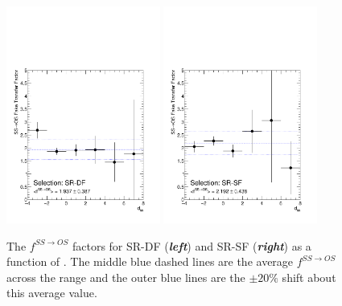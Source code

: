 \begin{figure}[!htb]
    \begin{center}
    \includegraphics[width=0.45\textwidth]{figures/search_hh/bkg_estimate/fake/fake_val_os_ss_ratio_NN_d_hh_sr_df}
    \includegraphics[width=0.45\textwidth]{figures/search_hh/bkg_estimate/fake/fake_val_os_ss_ratio_NN_d_hh_sr_sf}
    \caption{
        The $f^{SS \rightarrow OS}$ factors for SR-DF (\textit{\textbf{left}}) and SR-SF (\textit{\textbf{right}}) as a function
        of \dhh.
        The middle blue dashed lines are the average $f^{SS \rightarrow OS}$ across the \dhh range and the outer blue lines
        are the $\pm 20 \%$ shift about this average value.
    }
    \label{fig:fake_val_os_ss_ratio}
    \end{center}
\end{figure}

